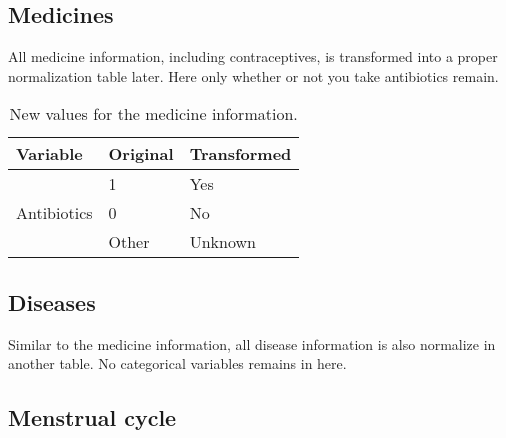 \subsection{Medicines}

All medicine information, including contraceptives, is transformed into a proper normalization table later. Here only whether or not you take antibiotics remain.\vspace{3 mm}

\begin{table}[H]
	\centering

    \label{table:Table_Medicines_Info_Transform_Categories}
    
	\renewcommand{\arraystretch}{1.5}

    \begin{tabular}{l | l | l}
		\hline
        \rowcolor[HTML]{FF9999}		
		
        \textbf{Variable} & \textbf{Original} & \textbf{Transformed} \\ 		
        
        \hline 
                                    
            \multirow{3}{*}{Antibiotics} & \multicolumn{1}{l}{1}     & \multicolumn{1}{l}{Yes}     \\\cline{2-3}
                                         & \multicolumn{1}{l}{0}     & \multicolumn{1}{l}{No}      \\\cline{2-3}
                                         & \multicolumn{1}{l}{Other} & \multicolumn{1}{l}{Unknown} \\\hline


        \end{tabular}

    \caption{New values for the medicine information.}

\end{table}

\subsection{Diseases}

Similar to the medicine information, all disease information is also normalize in another table. No categorical variables remains in here.\vspace{3 mm}

\subsection{Menstrual cycle}


